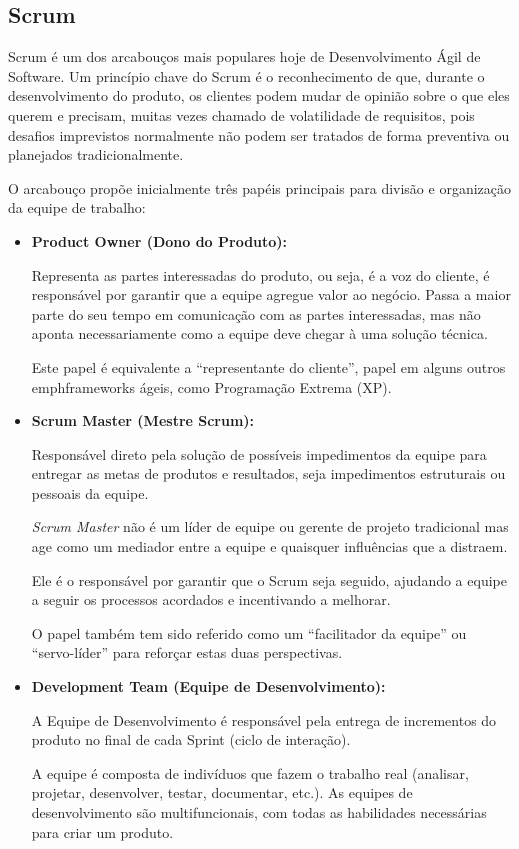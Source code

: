 \subsection{Scrum}
\par Scrum é um dos arcabouços mais populares hoje de Desenvolvimento Ágil de Software. Um princípio chave do Scrum é o reconhecimento de que, durante o desenvolvimento do produto, os clientes podem mudar de opinião sobre o que eles querem e precisam, muitas vezes chamado de volatilidade de requisitos, pois desafios imprevistos normalmente não podem ser tratados de forma preventiva ou planejados tradicionalmente.
\par O arcabouço propõe inicialmente três papéis principais para divisão e organização da equipe de trabalho:
\begin{itemize}
\item\textbf{Product Owner (Dono do Produto):}
\par Representa as partes interessadas do produto, ou seja, é a voz do cliente, é responsável por garantir que a equipe agregue valor ao negócio. Passa a maior parte do seu tempo em comunicação com as partes interessadas, mas não aponta necessariamente como a equipe deve chegar à uma solução técnica.
\par Este papel é equivalente a ``representante do cliente'', papel em alguns outros emph{frameworks} ágeis, como Programação Extrema (XP).
\item\textbf{Scrum Master (Mestre Scrum):}
\par Responsável direto pela solução de possíveis impedimentos da equipe para entregar as metas de produtos e resultados, seja impedimentos estruturais ou pessoais da equipe.
\par \emph{Scrum Master} não é um líder de equipe ou gerente de projeto tradicional mas age como um mediador entre a equipe e quaisquer influências que a distraem.
\par Ele é o responsável por garantir que o Scrum seja seguido, ajudando a equipe a seguir os processos acordados e incentivando a melhorar.
\par O papel também tem sido referido como um ``facilitador da equipe'' ou ``servo-líder'' para reforçar estas duas perspectivas.
\item\textbf{Development Team (Equipe de Desenvolvimento):}
\par A Equipe de Desenvolvimento é responsável pela entrega de incrementos do produto no final de cada Sprint (ciclo de interação).
\par A equipe é composta de indivíduos que fazem o trabalho real (analisar, projetar, desenvolver, testar, documentar, etc.). As equipes de desenvolvimento são multifuncionais, com todas as habilidades necessárias para criar um produto.
\end{itemize}
